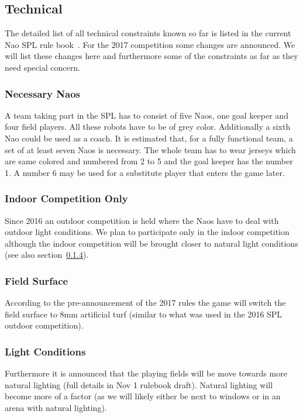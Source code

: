 \documentclass[12pt]{article}
\theoremstyle{definition}
\begin{document}
\subsection{Technical}\label{sec:technical}
The detailed list of all technical constraints known so far is listed in the current Nao SPL rule book~\cite{robocup_technical_committee_robocup_2016}. For the 2017 competition some changes are announced. We will list these changes here and furthermore some of the constraints as far as they need special concern.

\subsubsection{Necessary Naos}
A team taking part in the SPL has to consist of five Naos, one goal keeper and four field players. All these robots have to be of grey color. Additionally a sixth Nao could be used as a coach. It is estimated that, for a fully functional team, a set of at least seven Naos is necessary. The whole team has to wear jerseys which are same colored and numbered from 2 to 5 and the goal keeper has the number 1. A number 6 may be used for a substitute player that enters the game later.

\subsubsection{Indoor Competition Only}
Since 2016 an outdoor competition is held where the Naos have to deal with outdoor light conditions. We plan to participate only in the indoor competition although the indoor competition will be brought closer to natural light conditions (see also section~\ref{sec:light}).

\subsubsection{Field Surface}
According to the pre-announcement of the 2017 rules the game will switch the field surface to 8mm artificial turf (similar to what was used in the 2016 SPL outdoor competition).

\subsubsection{Light Conditions}\label{sec:light}
Furthermore it is announced that the playing fields will be move towards more natural lighting (full details in Nov 1 rulebook draft). Natural lighting will become more of a factor (as we will likely either be next to windows or in an arena with natural lighting).
\end{document}
